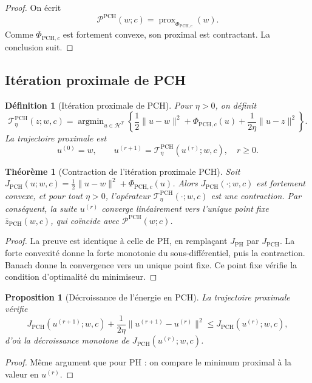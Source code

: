 \documentclass[11pt,a4paper]{article}
\newtheorem{definition}{Définition}[section]
\newtheorem{proposition}{Proposition}[section]
\newtheorem{theorem}{Théorème}[section]
\DeclareMathOperator{\prox}{prox}
\DeclareMathOperator{\argmin}{argmin}
\newcommand{\Hh}{\mathcal H}
\newcommand{\Pcal}{\mathcal P}
\newcommand{\1}{\mathbf 1}
\begin{document}
\begin{proof}
On écrit
\[
\Pcal^{\mathrm{PCH}}(w;c)=\prox_{\Phi_{\mathrm{PCH},c}}(w).
\]
Comme \(\Phi_{\mathrm{PCH},c}\) est fortement convexe, son proximal est contractant.  
La conclusion suit.
\end{proof}

\subsection{Itération proximale de PCH}

\begin{definition}[Itération proximale de PCH]
Pour \(\eta>0\), on définit
\[
\mathcal T^{\mathrm{PCH}}_{\eta}(z;w,c)
=
\argmin_{u\in\Hh^T}
\left\{
\frac12\|u-w\|^2+\Phi_{\mathrm{PCH},c}(u)+\frac{1}{2\eta}\|u-z\|^2
\right\}.
\]
La trajectoire proximale est
\[
u^{(0)}=w,
\qquad
u^{(r+1)}=\mathcal T^{\mathrm{PCH}}_{\eta}(u^{(r)};w,c),
\quad r\ge 0.
\]
\end{definition}

\begin{theorem}[Contraction de l'itération proximale PCH]
Soit \(J_{\mathrm{PCH}}(u;w,c)=\frac12\|u-w\|^2+\Phi_{\mathrm{PCH},c}(u)\).  
Alors \(J_{\mathrm{PCH}}(\cdot;w,c)\) est fortement convexe, et pour tout \(\eta>0\), l'opérateur \(\mathcal T^{\mathrm{PCH}}_{\eta}(\cdot;w,c)\) est une contraction.  
Par conséquent, la suite \(u^{(r)}\) converge linéairement vers l'unique point fixe \(\bar z_{\mathrm{PCH}}(w,c)\), qui coïncide avec \(\Pcal^{\mathrm{PCH}}(w;c)\).
\end{theorem}

\begin{proof}
La preuve est identique à celle de PH, en remplaçant \(J_{\mathrm{PH}}\) par \(J_{\mathrm{PCH}}\).  
La forte convexité donne la forte monotonie du sous-différentiel, puis la contraction.  
Banach donne la convergence vers un unique point fixe.  
Ce point fixe vérifie la condition d'optimalité du minimiseur.
\end{proof}

\begin{proposition}[Décroissance de l'énergie en PCH]
La trajectoire proximale vérifie
\[
J_{\mathrm{PCH}}(u^{(r+1)};w,c)
+
\frac{1}{2\eta}\|u^{(r+1)}-u^{(r)}\|^2
\le
J_{\mathrm{PCH}}(u^{(r)};w,c),
\]
d'où la décroissance monotone de \(J_{\mathrm{PCH}}(u^{(r)};w,c)\).
\end{proposition}

\begin{proof}
Même argument que pour PH : on compare le minimum proximal à la valeur en \(u^{(r)}\).
\end{proof}
\end{document}
